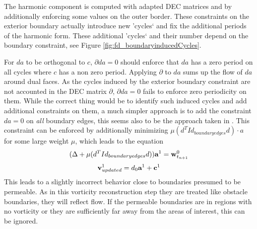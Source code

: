 The harmonic component is computed with adapted DEC matrices and by additionally enforcing some values on the outer border.  These constraints on the exterior boundary actually introduce new 'cycles` and fix the additional periods of the harmonic form. These additional 'cycles` and their number depend on the boundary constraint, see Figure \ref{fig:fd_boundaryinducedCycles}.

For $da$ to be orthogonal to $c$, $\partial d a = 0$ should enforce that $da$ has a zero period on all cycles where $c$ has a non zero period. Applying $\partial$ to $da$ sums up the flow of $da$ around dual faces. As the cycles induced by the exterior boundary constraint are not accounted in the DEC matrix $\partial$, $\partial d a = 0$ fails to enforce zero periodicity on them. While the correct thing would be to identify such induced cycles and add additional constraints on them, a much simpler approach is to add the constraint $da = 0$ on \emph{all} boundary edges, this seems also to be the approach taken in \cite{simplicialFluids}. This constraint can be enforced by additionally minimizing $\mu(d^TId_{boundaryedges} d)\cdot a$ for some large weight $\mu$, which leads to the equation
\begin{equation}(\Delta + \mu(d^T Id_{boundaryedges} d)) \textbf{a}^1 = \textbf{w}^0_{t_{n+1}}\end{equation}
\begin{equation}\textbf{v}^1_{updated} =  d_0 \textbf{a}^1 + \textbf{c}^1\end{equation}
This leads to a slightly incorrect behavior close to boundaries presumed to be permeable. As in this vorticity reconstruction step they are treated like obstacle boundaries, they will reflect flow. If the permeable boundaries are in regions with no vorticity or they are sufficiently far away from the areas of interest, this can be ignored.


